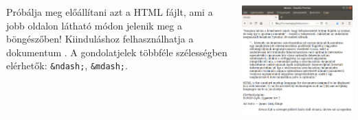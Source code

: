 \begin{frame}
  \begin{columns}[c]
      Próbálja meg előállítani azt a HTML fájlt, ami a jobb oldalon látható módon jelenik meg a böngészőben!
      Kiinduláshoz felhasználhatja a dokumentum .
      A gondolatjelek többféle szélességben elérhetők: \texttt{\&ndash;}, \texttt{\&mdash;}.
      \begin{center}
        \begin{exampleblock}{}
          \centering \includegraphics[scale=.23]{idezes.png}
        \end{exampleblock}
      \end{center}
  \end{columns}
\end{frame}
